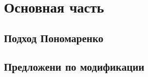 \newpage
\section{Основная часть}







\subsection{Подход Пономаренко}

\subsection{Предложени по модификации}